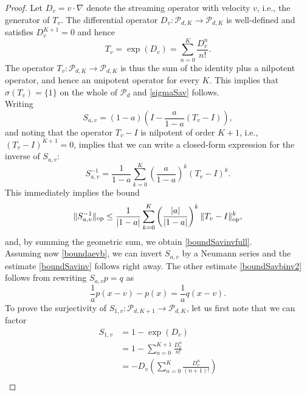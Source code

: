 \documentclass{amsart}
\theoremstyle{plain}
\theoremstyle{definition}
\begin{document}
\begin{proof}
Let $D_v=v\cdot\nabla$ denote the streaming operator with velocity $v$, i.e., the generator of $T_v$. The differential operator $D_v:\mathcal{P}_{d,K}\to\mathcal{P}_{d,K}$ is well-defined and satisfies $D_v^{K+1}=0$ and hence
\begin{equation}
    T_v = \exp(D_v) = \sum_{n=0}^K \frac{D^n_v}{n!}.
\end{equation}
The operator $T_v:\mathcal{P}_{d,K}\to\mathcal{P}_{d,K}$ is thus the sum of the identity plus a nilpotent operator, and hence an unipotent operator for every $K$. This implies that $\sigma(T_v)=\{1\}$ on the whole of $\mathcal{P}_d$ and \eqref{sigmaSav} follows.\\
Writing
\begin{equation}
    S_{a,v} = (1-a)\left(I-\frac{a}{1-a}(T_v-I)\right),
\end{equation}
and noting that the operator $T_v-I$ is nilpotent of order $K+1$, i.e., $(T_v-I)^{K+1}=0$, implies that we can write a closed-form expression for the inverse of $S_{a,v}$:
\begin{equation}\label{inversexplicit}
    S_{a,v}^{-1} = \frac{1}{1-a} \sum_{k=0}^K \left(\frac{a}{1-a}\right)^k(T_v-I)^k.
\end{equation}
This immediately implies the bound 
\begin{equation}
    \|S_{a,v}^{-1}\|_{\rm op} \leq \frac{1}{|1-a|}\sum_{k=0}^K \left(\frac{|a|}{|1-a|}\right)^{k} \|T_v-I\|_{\rm op}^k,
\end{equation}
and, by summing the geometric sum, we obtain \eqref{boundSavinvfull}.\\ 
Assuming now \eqref{boundaevb}, we can invert $S_{a,v}$ by a Neumann series and the estimate \eqref{boundSavinv} follows right away. The other estimate \eqref{boundSavbinv2} follows from rewriting $S_{a,v}p=q$ as 
\begin{equation}
\frac{1}{a}p(x-v) -p(x) = \frac{1}{a}q(x-v). 
\end{equation}
To prove the surjectivity of $S_{1,v}:\mathcal{P}_{d,K+1}\to\mathcal{P}_{d,K}$, let us first note that we can factor
\begin{equation}
\begin{split}
       S_{1,v} &  = 1 - \exp(D_v)\\
       & =  1 - \sum_{n=0}^{K+1}\frac{D^n_v}{n!} \\
       & = -D_v\left(\sum_{n=0}^{K}\frac{D_v^n}{(n+1)!}\right)\\

\end{split}
\end{equation}
\end{proof}
\end{document}
